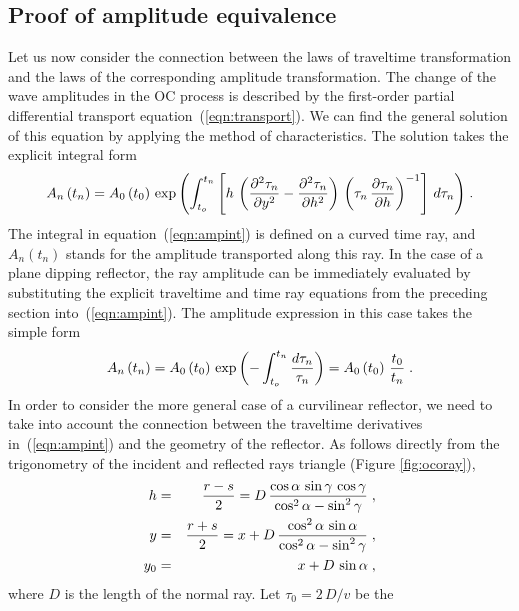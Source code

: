 \subsection{Proof of amplitude equivalence} 
Let us now consider the connection between the laws of traveltime
transformation and the laws of the corresponding amplitude
transformation.  The change of the wave amplitudes in the OC process
is described by the first-order partial differential transport
equation~(\ref{eqn:transport}). We can find the general solution of
this equation by applying the method of characteristics. The solution
takes the explicit integral form
\begin{equation}
A_n\left(t_n\right)=A_0\left(t_0\right)\,\exp{\left(\int_{t_o}^{t_n}
\left[h\,\left({\partial^2 \tau_n \over \partial y^2}-
{\partial^2 \tau_n \over \partial h^2}\right)\,
\left(\tau_n\,{\partial \tau_n \over \partial h} \right)^{-1}\right]\,
d\tau_n\right)}\;.
\label{eqn:ampint}
\end{equation}
The integral in equation~(\ref{eqn:ampint}) is defined on a curved
time ray, and $A_n(t_n)$ stands for the amplitude transported along
this ray. In the case of a plane dipping reflector, the ray amplitude
can be immediately evaluated by substituting the explicit traveltime
and time ray equations from the preceding section
into~(\ref{eqn:ampint}). The amplitude expression in this case takes
the simple form
\begin{equation}
A_n\left(t_n\right)=A_0\left(t_0\right)\,\exp{\left(-\int_{t_o}^{t_n}
\frac{d\tau_n}{\tau_n}\right)} = A_0\left(t_0\right)\,{t_0 \over t_n}\;.
\label{eqn:ampplane}
\end{equation}
In order to consider the more general case of a curvilinear reflector,
we need to take into account the connection between the traveltime
derivatives in~(\ref{eqn:ampint}) and the geometry of the reflector.
As follows directly from the trigonometry of the incident and
reflected rays triangle (Figure \ref{fig:ocoray}),
\begin{eqnarray}
h & = & {r-s \over 2}=
D\,{{\cos{\alpha}\,\sin{\gamma}\,\cos{\gamma}} \over
{\cos^2{\alpha}-\sin^2{\gamma}}}\;,
\label{eqn:geoh}\\
y & = & {r+s \over 2}=
x+D\,{{\cos^2{\alpha}\,\sin{\alpha}} \over
{\cos^2{\alpha}-\sin^2{\gamma}}}\;,
\label{eqn:geoy}\\
y_0 & = & x+D\,\sin{\alpha}\;,
\label{eqn:geoy0}
\end{eqnarray}
where $D$ is the length of the normal ray. Let $\tau_0=2\,D/v$ be the
